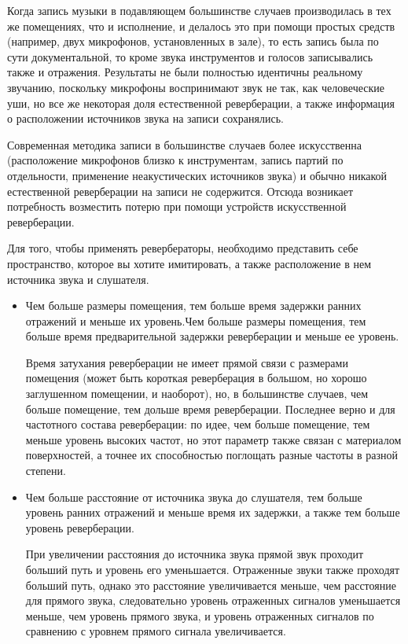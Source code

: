 \documentclass[oneside, final, 14pt]{extreport}
\begin{document}
Когда запись музыки в подавляющем большинстве случаев производилась в тех же помещениях, что и исполнение, и делалось это при помощи простых средств (например, двух микрофонов, установленных в зале), то есть запись была по сути документальной, то кроме звука инструментов и голосов записывались также и отражения. Результаты не были полностью идентичны реальному звучанию, поскольку микрофоны воспринимают звук не так, как человеческие уши, но все же некоторая доля естественной реверберации, а также информация о расположении источников звука на записи сохранялись.

Современная методика записи в большинстве случаев более искусственна (расположение микрофонов близко к инструментам, запись партий по отдельности, применение неакустических источников звука) и обычно никакой естественной реверберации на записи не содержится. Отсюда возникает потребность возместить потерю при помощи устройств искусственной реверберации.

Для того, чтобы применять ревербераторы, необходимо представить себе пространство, которое вы хотите имитировать, а также расположение в нем источника звука и слушателя.

\begin{itemize}
  \item
  Чем больше размеры помещения, тем больше время задержки ранних отражений и меньше их уровень.Чем больше размеры помещения, тем больше время предварительной задержки реверберации и меньше ее уровень.

  Время затухания реверберации не имеет прямой связи с размерами помещения (может быть короткая реверберация в большом, но хорошо заглушенном помещении, и наоборот), но, в большинстве случаев, чем больше помещение, тем дольше время реверберации. Последнее верно и для частотного состава реверберации: по идее, чем больше помещение, тем меньше уровень высоких частот, но этот параметр также связан с материалом поверхностей, а точнее их способностью поглощать разные частоты в разной степени.
  \item
  Чем больше расстояние от источника звука до слушателя, тем больше уровень ранних отражений и меньше время их задержки, а также тем больше уровень реверберации.

  При увеличении расстояния до источника звука прямой звук проходит больший путь и уровень его уменьшается. Отраженные звуки также проходят больший путь, однако это расстояние увеличивается меньше, чем расстояние для прямого звука, следовательно уровень отраженных сигналов уменьшается меньше, чем уровень прямого звука, и уровень отраженных сигналов по сравнению с уровнем прямого сигнала увеличивается.
\end{itemize}
\end{document}
